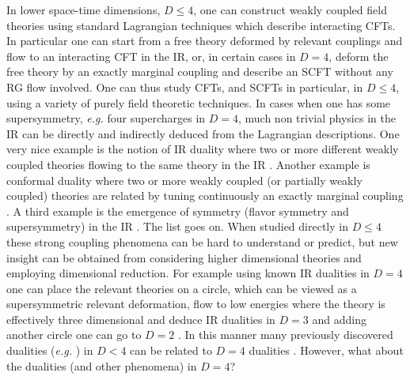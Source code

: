 \documentclass[12pt]{article}
\begin{document}
In lower space-time dimensions, $D\leq 4$, one can construct weakly coupled field theories using standard Lagrangian techniques which describe interacting CFTs. In particular one can start from a free theory deformed by relevant couplings and flow to an interacting CFT in the IR, or, in certain cases in $D=4$, deform the free theory by an exactly marginal coupling and describe an SCFT without any RG flow involved.
One can thus study CFTs, and SCFTs in particular, in $D\leq 4$, using a variety of purely field theoretic techniques. In cases when one has some supersymmetry, {\it e.g.} four supercharges in $D=4$, much non trivial physics in the IR can be directly and indirectly deduced from the Lagrangian descriptions. One very nice example is the  notion of IR duality where two or more different weakly coupled theories flowing to the same theory in the IR \cite{Seiberg:1994pq}. Another example is conformal duality where two or more weakly coupled (or partially weakly coupled) theories are related by tuning continuously an exactly marginal coupling \cite{Leigh:1995ep,Witten:1997sc,Green:2010da,Gaiotto:2009we,Razamat:2020pra,Razamat:2019vfd}. A third example is the emergence of symmetry (flavor symmetry and supersymmetry) in the IR \cite{Razamat:2017wsk,Dimofte:2012pd,Razamat:2018gbu,Sela:2019nqa,Maruyoshi:2016tqk,Maruyoshi:2016aim,Agarwal:2016pjo}. The list goes on. When studied directly in $D\leq4$ these strong coupling phenomena can be hard to understand or predict, but new insight can be obtained from considering higher dimensional theories and employing dimensional reduction. For example using known IR dualities in $D=4$ one can place the relevant theories on a circle, which can be viewed as a supersymmetric relevant deformation, flow to low energies where the theory is effectively three dimensional and deduce IR dualities in $D=3$ and adding another circle one can go to $D=2$ \cite{Niarchos:2012ah,Aharony:2013dha,Aharony:2013kma,Park:2013wta,Dolan:2011rp,Gadde:2011ia,Pasquetti:2019hxf,Hwang:2020wpd,Bottini:2021vms,Nii:2014jsa}. In this manner many previously discovered dualities ({\it e.g.} \cite{Aharony:1997gp,Giveon:2008zn,Hori:2006dk,Gadde:2013lxa,Hori:2000kt,Jafferis:2011ns}) in $D<4$ can be related to $D=4$ dualities \cite{Aganagic:2001uw,Gadde:2015wta,Dedushenko:2017osi,Sacchi:2020pet,Aharony:2017adm}. However, what about the dualities (and other phenomena) in $D=4$? 
\end{document}
